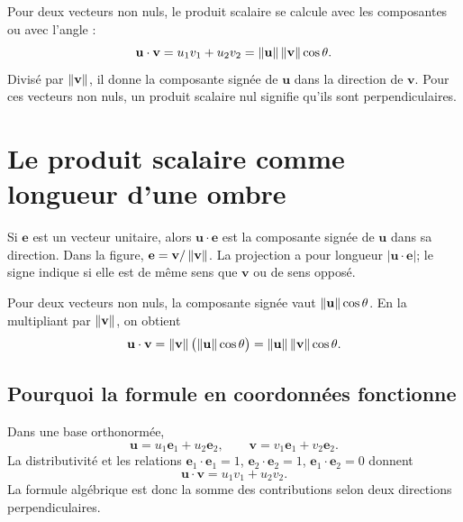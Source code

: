 \begin{connectionbox}
Pour deux vecteurs non nuls, le produit scalaire se calcule avec les composantes ou avec l'angle :
\[
\mathbf u\cdot\mathbf v=u_1v_1+u_2v_2
=\left\lVert \mathbf u\right\rVert\left\lVert \mathbf v\right\rVert\cos\theta.
\]
Divisé par $\left\lVert \mathbf v\right\rVert$, il donne la composante signée de $\mathbf u$ dans la direction de $\mathbf v$. Pour ces vecteurs non nuls, un produit scalaire nul signifie qu'ils sont perpendiculaires.
\end{connectionbox}


\section{Le produit scalaire comme longueur d'une ombre}
\label{manual:section:09.07}

Si $\mathbf e$ est un vecteur unitaire, alors $\mathbf u\cdot\mathbf e$ est la composante signée de $\mathbf u$ dans sa direction. Dans la figure, $\mathbf e=\mathbf v/\left\lVert \mathbf v\right\rVert$. La projection a pour longueur $|\mathbf u\cdot\mathbf e|$; le signe indique si elle est de même sens que $\mathbf v$ ou de sens opposé.

\begin{center}
\end{center}

Pour deux vecteurs non nuls, la composante signée vaut $\left\lVert \mathbf u\right\rVert\cos\theta$. En la multipliant par $\left\lVert \mathbf v\right\rVert$, on obtient
\[
\mathbf u\cdot\mathbf v
=\left\lVert \mathbf v\right\rVert\bigl(\left\lVert \mathbf u\right\rVert\cos\theta\bigr)
=\left\lVert \mathbf u\right\rVert\left\lVert \mathbf v\right\rVert\cos\theta.
\]

\subsection{Pourquoi la formule en coordonnées fonctionne}
Dans une base orthonormée,
\[
\mathbf u=u_1\mathbf e_1+u_2\mathbf e_2,
\qquad
\mathbf v=v_1\mathbf e_1+v_2\mathbf e_2.
\]
La distributivité et les relations $\mathbf e_1\cdot\mathbf e_1=1$, $\mathbf e_2\cdot\mathbf e_2=1$, $\mathbf e_1\cdot\mathbf e_2=0$ donnent
\[
\mathbf u\cdot\mathbf v=u_1v_1+u_2v_2.
\]
La formule algébrique est donc la somme des contributions selon deux directions perpendiculaires.


